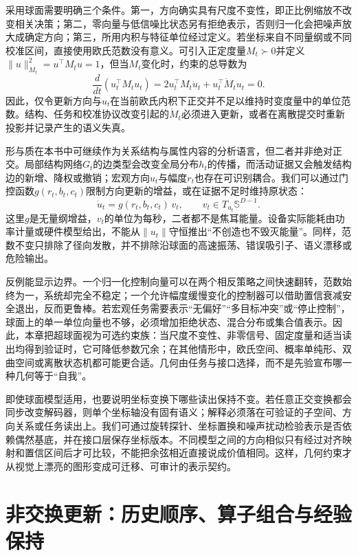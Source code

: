 采用球面需要明确三个条件。第一，方向确实具有尺度不变性，即正比例缩放不改变相关决策；第二，零向量与低信噪比状态另有拒绝表示，否则归一化会把噪声放大成确定方向；第三，所用内积与特征单位经过定义。若坐标来自不同量纲或不同校准区间，直接使用欧氏范数没有意义。可引入正定度量$M_t\succ0$并定义$\|u\|_{M_t}^2=u^\top M_tu=1$，但当$M_t$变化时，约束的总导数为
\begin{equation}
 \frac{d}{dt}(u_t^\top M_tu_t)=2u_t^\top M_t\dot u_t+u_t^\top\dot M_tu_t=0.
\end{equation}
因此，仅令更新方向与$u_t$在当前欧氏内积下正交并不足以维持时变度量中的单位范数。结构、任务和校准协议改变引起的$\dot M_t$必须进入更新，或者在离散提交时重新投影并记录产生的语义失真。

形与质在本书中可继续作为关系结构与属性内容的分析语言，但二者并非绝对正交。局部结构网络$G_t$的边类型会改变全局分布$h_t$的传播，而活动证据又会触发结构边的新增、降权或撤销；宏观方向$u_t$与幅度$r_t$也存在可识别耦合。我们可以通过门控函数$g(r_t,b_t,c_t)$限制方向更新的增益，或在证据不足时维持原状态：
\begin{equation}
 \dot u_t=g(r_t,b_t,c_t)\,v_t,
 \qquad v_t\in T_{u_t}\mathbb S^{D-1}.
\end{equation}
这里$g$是无量纲增益，$v_t$的单位为每秒，二者都不是焦耳能量。设备实际能耗由功率计量或硬件模型给出，不能从$\|u_t\|$守恒推出“不创造也不毁灭能量”。同样，范数不变只排除了径向发散，并不排除沿球面的高速振荡、错误吸引子、语义漂移或危险输出。

反例能显示边界。一个归一化控制向量可以在两个相反策略之间快速翻转，范数始终为一，系统却完全不稳定；一个允许幅度缓慢变化的控制器可以借助置信衰减安全退出，反而更鲁棒。若宏观任务需要表示“无偏好”“多目标冲突”或“停止控制”，球面上的单一单位向量也不够，必须增加拒绝状态、混合分布或集合值表示。因此，本章把超球面视为可选约束族：当尺度不变性、非零信号、固定度量和适当读出均得到验证时，它可降低参数冗余；在其他情形中，欧氏空间、概率单纯形、双曲空间或离散状态机都可能更合适。几何由任务与接口选择，而不是先验宣布哪一种几何等于“自我”。

即使球面模型适用，也要说明坐标变换下哪些读出保持不变。若任意正交变换都会同步改变解码器，则单个坐标轴没有固有语义；解释必须落在可验证的子空间、方向关系或任务读出上。我们可通过旋转探针、坐标置换和噪声扰动检验表示是否依赖偶然基底，并在接口层保存坐标版本。不同模型之间的方向相似只有经过对齐映射和置信区间后才可比较，不能把余弦相近直接说成价值相同。这样，几何约束才从视觉上漂亮的图形变成可迁移、可审计的表示契约。

\section{非交换更新：历史顺序、算子组合与经验保持}
\label{sec:non_abelian_lie_group_properties}


